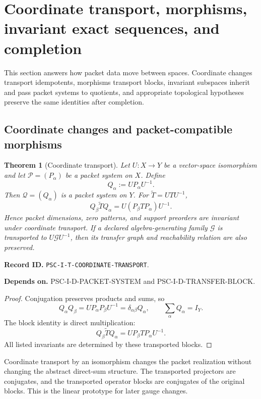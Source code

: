 \documentclass[11pt]{article}
\newtheorem{theorem}{Theorem}[section]
\theoremstyle{definition}
\theoremstyle{remark}
\newcommand{\Pcal}{\mathcal P}
\newcommand{\Qcal}{\mathcal Q}
\newcommand{\RecordID}[1]{\par\smallskip\noindent\begingroup\footnotesize\color{PSCGray}\raggedright\textbf{Record ID.} \nolinkurl{#1}.\par\endgroup}
\newcommand{\Depends}[1]{\par\noindent\begingroup\footnotesize\color{PSCGray}\raggedright\textbf{Depends on.} #1\par\endgroup}
\begin{document}
\section{Coordinate transport, morphisms, invariant exact sequences, and completion}
\begin{readerroadmap}
This section answers how packet data move between spaces.  Coordinate changes transport idempotents, morphisms transport blocks, invariant subspaces inherit and pass packet systems to quotients, and appropriate topological hypotheses preserve the same identities after completion.
\end{readerroadmap}
\subsection{Coordinate changes and packet-compatible morphisms}

\begin{theorem}[Coordinate transport]
\label{thm:coordinate-transport}
Let $U:X\to Y$ be a vector-space isomorphism and let $\Pcal=(P_\alpha)$ be a packet system on $X$.  Define
\[
Q_\alpha:=UP_\alpha U^{-1}.
\]
Then $\Qcal=(Q_\alpha)$ is a packet system on $Y$.  For $\widetilde T=UTU^{-1}$,
\[
\boxed{
Q_\beta\widetilde TQ_\alpha
=
U(P_\beta TP_\alpha)U^{-1}.
}
\]
Hence packet dimensions, zero patterns, and support preorders are invariant under coordinate transport.  If a declared algebra-generating family $\mathcal G$ is transported to $U\mathcal G U^{-1}$, then its transfer graph and reachability relation are also preserved.
\end{theorem}
\RecordID{PSC-I-T-COORDINATE-TRANSPORT}
\Depends{PSC-I-D-PACKET-SYSTEM and PSC-I-D-TRANSFER-BLOCK.}

\begin{proof}
Conjugation preserves products and sums, so
\[
Q_\alpha Q_\beta
=UP_\alpha P_\beta U^{-1}
=\delta_{\alpha\beta}Q_\alpha,
\qquad
\sum_\alpha Q_\alpha=I_Y.
\]
The block identity is direct multiplication:
\[
Q_\beta\widetilde TQ_\alpha
=UP_\beta TP_\alpha U^{-1}.
\]
All listed invariants are determined by these transported blocks.
\end{proof}

\begin{interpretation}
Coordinate transport by an isomorphism changes the packet realization without changing the abstract direct-sum structure.  The transported projectors are conjugates, and the transported operator blocks are conjugates of the original blocks.  This is the linear prototype for later gauge changes.
\end{interpretation}
\end{document}
